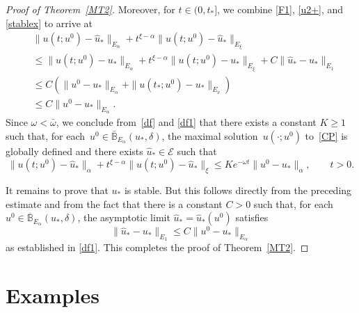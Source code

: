 \documentclass[reqno,11pt]{amsart}
\numberwithin{equation}{section}
\theoremstyle{remark}
\begin{document}
\begin{proof}[Proof of Theorem~\ref{MT2}]
Moreover, for $t\in(0,t_*]$, we combine \eqref{F1}, \eqref{u2+}, and \eqref{stablex} to arrive at 
\begin{equation}\label{df1}
\begin{aligned}
&\|u(t;u^0)-\hat u_*\|_{E_\alpha }+t^{\xi-\alpha} \|u(t;u^0)-\hat u_*\|_{E_\xi }\\
&\leq \|u(t;u^0)- u_*\|_{E_\alpha }+t^{\xi-\alpha} \|u(t;u^0)-u_*\|_{E_\xi }+C\|\hat u_*-u_*\|_{E_1}\\
&\leq C(\|u^0-u_*\|_{E_\alpha }+\|u(t_*;u^0)-u_*\|_{E_\nu })\\
&\leq C\|u^0-u_*\|_{E_\alpha }.
\end{aligned}
\end{equation}  
Since $\omega<\bar\omega$, we conclude from~\eqref{df} and \eqref{df1} that there exists  a constant $K\geq 1$  such that, for each~$u^0\in \bar{\mathbb{B}}_{E_\alpha }(u_*,\delta)$, 
the maximal solution~$u(\cdot;u^0)$ to~\eqref{CP} is globally defined and there exists $\hat u_*\in \mathcal{E}$  such that 
\begin{equation*}
\|u(t;u^0)- \hat u_* \|_\alpha +t^{\xi-\alpha}\|u(t;u^0)- \hat u_* \|_\xi\le K e^{-\omega t}\|u^0-u_*\|_\alpha,\qquad t> 0.
\end{equation*}

It remains to prove that $u_*$ is stable. 
But this follows directly from the preceding estimate and from the fact that there is a constant $C>0$ such that,  for each~${u^0 \in \overline{\mathbb{B}}_{E_\alpha}(u_*,\delta)}$, the asymptotic limit 
 $\hat u_*=\hat u_*(u^0)$ satisfies
\[
\|\hat u_* - u_*\|_{E_1} \le C \|u^0 - u_*\|_{E_\alpha}
\]
as established in \eqref{df1}.  This completes the proof of Theorem~\ref{MT2}.
\end{proof}





 
\section{Examples}\label{Sec:4}
\end{document}
